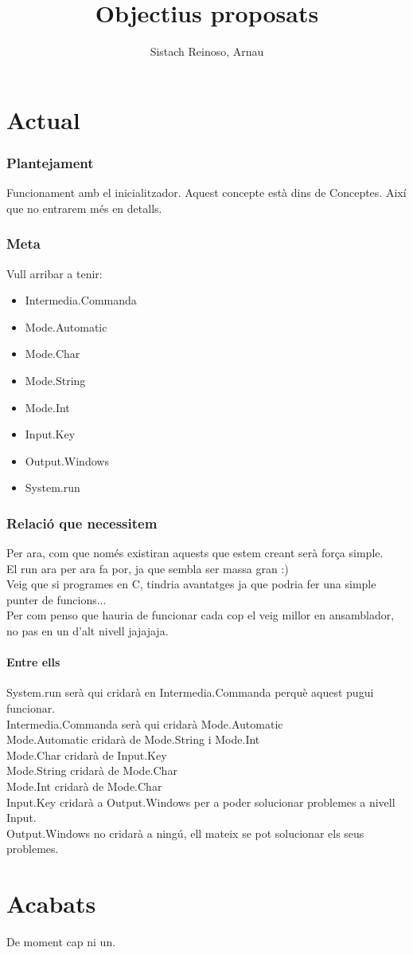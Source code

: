 \documentclass{article}
\title{Objectius proposats}
\author{Sistach Reinoso, Arnau}
\begin{document}
\maketitle
\tableofcontents
\newpage

\part{Actual}
\section{Plantejament}
Funcionament amb el inicialitzador. Aquest concepte està dins de Conceptes. Així que no entrarem més en detalls.

\section{Meta}
Vull arribar a tenir:
\begin{itemize}
\item Intermedia.Commanda
\item Mode.Automatic
\item Mode.Char
\item Mode.String
\item Mode.Int
\item Input.Key
\item Output.Windows
\item System.run
\end{itemize}

\section{Relació que necessitem}
Per ara, com que només existiran aquests que estem creant serà força simple.\\

El run ara per ara fa por, ja que sembla ser massa gran :)\\
Veig que si programes en C, tindria avantatges ja que podria fer una simple punter de funcions...\\
Per com penso que hauria de funcionar cada cop el veig millor en ansamblador, no pas en un d'alt nivell jajajaja.
\subsection{Entre ells}
System.run serà qui cridarà en Intermedia.Commanda perquè aquest pugui funcionar.\\
Intermedia.Commanda serà qui cridarà Mode.Automatic\\
Mode.Automatic cridarà de Mode.String i Mode.Int\\
Mode.Char cridarà de Input.Key\\
Mode.String cridarà de Mode.Char\\
Mode.Int cridarà de Mode.Char\\
Input.Key cridarà a Output.Windows per a poder solucionar problemes a nivell Input.\\
Output.Windows no cridarà a ningú, ell mateix se pot solucionar els seus problemes.\\

\newpage
\part{Acabats}
De moment cap ni un.
\end{document}
